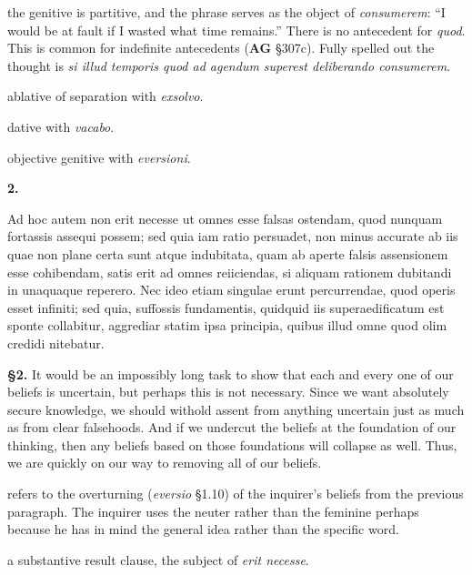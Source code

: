  the genitive is partitive, and the phrase serves as the object of \textit{consumerem}: ``I would be at fault if I wasted what time remains.'' There is no antecedent for \textit{quod}. This is common for indefinite antecedents (\textbf{AG} §307c). Fully spelled out the thought is \textit{si illud temporis quod ad agendum superest deliberando consumerem}.

 ablative of separation with \textit{exsolvo}.

 dative with \textit{vacabo}.

 objective genitive with \textit{eversioni}.


\clearpage

\beginnumbering
\pstart
\textbf{2.} \begin{latin}Ad hoc autem non erit necesse ut omnes esse falsas ostendam, quod nunquam fortassis assequi possem; sed quia iam ratio persuadet, non minus accurate ab iis quae non plane certa sunt atque indubitata, quam ab aperte falsis assensionem esse cohibendam, satis erit ad omnes reiiciendas, si aliquam rationem dubitandi in unaquaque reperero. Nec ideo etiam singulae erunt percurrendae, quod operis esset infiniti; sed quia, suffossis fundamentis, quidquid iis superaedificatum est sponte collabitur, aggrediar statim ipsa principia, quibus illud omne quod olim credidi nitebatur.\end{latin}
\pend
\endnumbering

\prenotes

\textbf{§2.} It would be an impossibly long task to show that each and every one of our beliefs is uncertain, but perhaps this is not necessary. Since we want absolutely secure knowledge, we should withold assent from anything uncertain just as much as from clear falsehoods. And if we undercut the beliefs at the foundation of our thinking, then any beliefs based on those foundations will collapse as well. Thus, we are quickly on our way to removing all of our beliefs.

 refers to the overturning (\textit{eversio} §1.10) of the inquirer's beliefs from the previous paragraph. The inquirer uses the neuter rather than the feminine perhaps because he has in mind the general idea rather than the specific word.

 a substantive result clause, the subject of \textit{erit necesse}.

